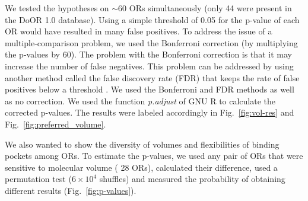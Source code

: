 \documentclass[fleqn,11pt]{wlscirep}
\newcommand{\numberofreceptors}{ 28 }
\begin{document}
We tested the hypotheses on $\sim$60 ORs simultaneously (only 44 were present in the DoOR 1.0 database). 
Using a simple threshold of 0.05 for the p-value of each OR would have resulted in many false positives. 
To address the issue of a multiple-comparison problem, 
we used the Bonferroni correction (by multiplying the p-values by 60). 
The problem with the Bonferroni correction is that it may increase the number of false negatives.
This problem can be addressed by using another method called the false discovery rate (FDR) that keeps the rate of false positives below a threshold \cite{benjamini1995controlling,shaffer1995multiple}.
We used the Bonferroni and FDR methods as well as no correction. We used the function \textit{p.adjust} of GNU R to calculate the corrected p-values. 
The results were labeled accordingly in Fig.~\ref{fig:vol-res} and Fig.~\ref{fig:preferred_volume}.

We also wanted to show the diversity of volumes and flexibilities of binding pockets among ORs.
To estimate the p-values, 
we used any pair of ORs that were sensitive to molecular volume (\numberofreceptors ORs),
calculated their difference, 
used a permutation test ($6\times10^4$ shuffles) and measured the probability of obtaining different results (Fig.~\ref{fig:p-values}).
\end{document}
